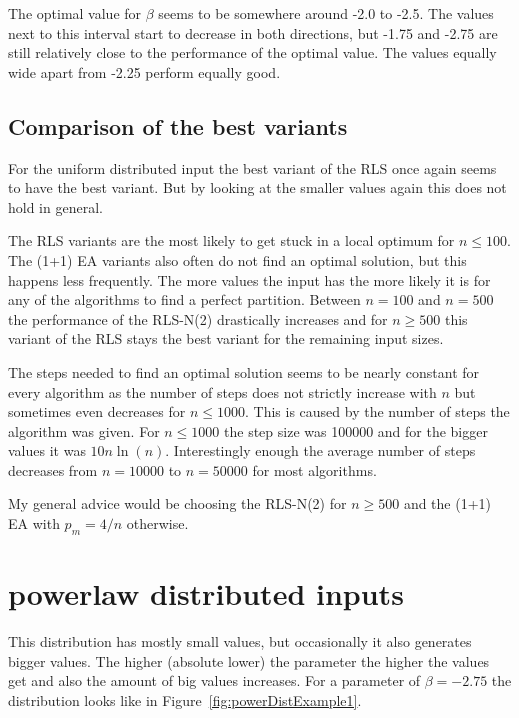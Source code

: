 

The optimal value for $\beta$ seems to be somewhere around -2.0 to -2.5.
The values next to this interval start to decrease in both directions, but -1.75 and -2.75 are still relatively close to the performance of the optimal value.
The values equally wide apart from -2.25 perform equally good.

\subsection{Comparison of the best variants}




For the uniform distributed input the best variant of the RLS once again seems to have the best variant.
But by looking at the smaller values again this does not hold in general.



The RLS variants are the most likely to get stuck in a local optimum for $n\le100$. The (1+1) EA variants also often do not find an optimal solution, but this happens less frequently. The more values the input has the more likely it is for any of the algorithms to find a perfect partition. Between $n=100$ and $n=500$ the performance of the RLS-N(2) drastically increases and for $n\ge500$ this variant of the RLS stays the best variant for the remaining input sizes.



The steps needed to find an optimal solution seems to be nearly constant for every algorithm as the number of steps does not strictly increase with $n$ but sometimes even decreases for $n\le1000$.
This is caused by the number of steps the algorithm was given.
For $n\le1000$ the step size was 100000 and for the bigger values it was $10n\ln(n)$.
Interestingly enough the average number of steps decreases from $n=10000$ to $n=50000$ for most algorithms.



My general advice would be choosing the RLS-N(2) for $n\ge500$ and the (1+1) EA with $p_m=4/n$ otherwise.
\section{powerlaw distributed inputs}
This distribution has mostly small values, but occasionally it also generates bigger values.
The higher (absolute lower) the parameter the higher the values get and also the amount of big values increases.
For a parameter of $\beta=-2.75$ the distribution looks like in Figure~\ref{fig:powerDistExample1}.

